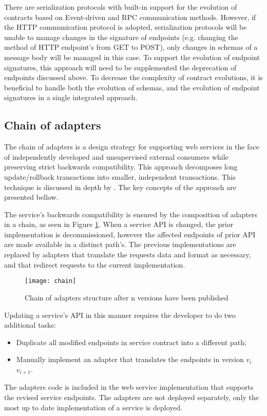 There are serialization protocols with built-in support for the evolution of contracts based on Event-driven and RPC communication methods.
However, if the HTTP communication protocol is adopted, serialization protocols will be unable to manage changes in the signature of endpoints (e.g. changing the method of HTTP endpoint's from GET to POST),
only changes in schemas of a message body will be managed in this case.
To support the evolution of endpoint signatures, this approach will need to be supplemented the deprecation of endpoints discussed above.
To decrease the complexity of contract evolutions, it is beneficial to handle both the evolution of schemas, and the evolution of endpoint signatures in a single integrated approach.

\subsection{Chain of adapters} %
\label{sec:chain_of_adapters}

The chain of adapters is a design strategy for supporting web services in the face of independently developed and unsupervised external consumers while preserving strict backwards compatibility.
This approach decomposes long update/rollback transactions into smaller, independent transactions.
This technique is discussed in depth by \citeauthor{13} \cite{13}.
The key concepts of the approach are presented bellow.

The service's backwards compatibility is ensured by the composition of adapters in a chain, as seen in Figure \ref{fig:chain}.
When a service API is changed, the prior implementation is decommissioned, however the affected endpoints of prior API are made available in a distinct path's.
The previous implementations are replaced by adapters that translate the requests data and format as necessary, and that redirect requests to the current implementation.

\begin{figure}[htbp]
    \centering
    \texttt{[image: chain]}
    \caption{Chain of adapters structure
    after n versions have been published }
    \label{fig:chain}
\end{figure}

Updating a service's API in this manner requires the developer to do two additional tasks:
\begin{itemize}
    \setlength\itemsep{0em}
    \item Duplicate all modified endpoints in service contract into a different path;
    \item Manually implement an adapter that translates the endpoints in version $v_i$\textrightarrow$v_{i+1}$.
\end{itemize}
The adapters code is included in the web service implementation that supports the revised service endpoints.
The adapters are not deployed separately, only the most up to date implementation of a service is deployed.

